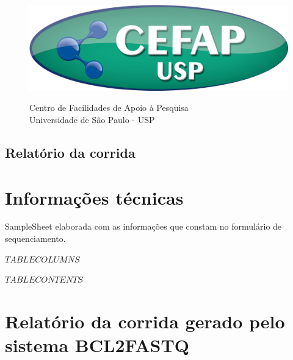 \documentclass[a4paper]{article}
\begin{document}
\begin{figure}[!htb]
    \centering
    \begin{minipage}{.5\textwidth}
        \centering
        \includegraphics[scale = 0.27]{logo_CEFAP.png}
    \end{minipage}%
    \begin{minipage}{0.5\textwidth}
        \centering
        Centro de Facilidades de Apoio à Pesquisa\\
        Universidade de São Paulo - USP
    \end{minipage}
\end{figure}

\begin{center}

\section*{Relatório da corrida}

\end{center}

\section*{Informações técnicas}

SampleSheet elaborada com as informações que constam no formulário de sequenciamento.

\begin{tiny}
\begin{longtable}$TABLECOLUMNS$
\caption{Detalhes da corrida realizada no equipamento $EQUIPAMENTO$.}
\label{TabDetalhesCorrida}
\endfirsthead
\hline
$TABLECONTENTS$
\end{longtable}
\end{tiny}

\section*{Relatório da corrida gerado pelo sistema BCL2FASTQ}
\end{document}

